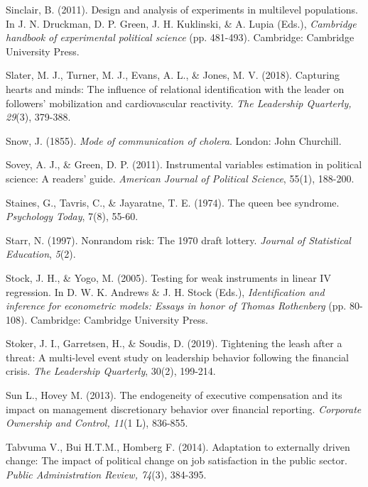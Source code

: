 \documentclass[english]{article}
\begin{document}
\begin{singlespace}
\begin{list}{}{\setlength\itemindent{-\leftmargin}}
\item Sinclair, B. (2011). Design and analysis of experiments in multilevel populations. In J. N. Druckman, D. P. Green, J. H. Kuklinski, \& A.  Lupia (Eds.), \emph{Cambridge handbook of experimental political science} (pp. 481-493). Cambridge: Cambridge University Press.

\item Slater, M. J., Turner, M. J., Evans, A. L., \& Jones, M. V. (2018).  Capturing hearts and minds: The influence of relational identification with the leader on followers' mobilization and cardiovascular reactivity. \emph{The Leadership Quarterly, 29}(3), 379-388.

\item Snow, J. (1855). \emph{Mode of communication of cholera}. London: John Churchill.

\item Sovey, A. J., \& Green, D. P. (2011). Instrumental variables estimation in political science: A readers' guide. \emph{American Journal of Political Science}, 55(1), 188-200.

\item Staines, G., Tavris, C., \& Jayaratne, T. E. (1974). The queen bee syndrome. \emph{Psychology Today}, 7(8), 55-60.

\item Starr, N. (1997). Nonrandom risk: The 1970 draft lottery. \emph{Journal of Statistical Education}, \emph{5}(2).

\item Stock, J. H., \& Yogo, M. (2005). Testing for weak instruments in linear IV regression. In D. W. K. Andrews \& J. H. Stock (Eds.), \emph{Identification and inference for econometric models: Essays in honor of Thomas Rothenberg} (pp. 80-108). Cambridge: Cambridge University Press.

\item Stoker, J. I., Garretsen, H., \& Soudis, D. (2019). Tightening the leash after a threat: A multi-level event study on leadership behavior following the financial crisis. \emph{The Leadership Quarterly}, 30(2), 199-214.

\item *Sun L., Hovey M. (2013). The endogeneity of executive compensation and its impact on management discretionary behavior over financial reporting. \emph{Corporate Ownership and Control, 11}(1 L), 836-855.

\item *Tabvuma V., Bui H.T.M., Homberg F. (2014). Adaptation to externally driven change: The impact of political change on job satisfaction in the public sector. \emph{Public Administration Review, 74}(3), 384-395.


\end{list}
\end{singlespace}
\end{document}
